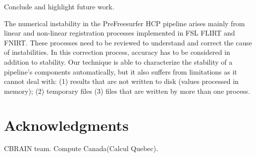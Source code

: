 \documentclass{article}
\begin{document}
Conclude and highlight future work.

The numerical instability in the PreFreesurfer HCP pipeline arises mainly from linear and non-linear registration processes 
implemented in FSL FLIRT and FNIRT. These processes need to be reviewed to understand and correct the cause of instabilities. 
In this correction process, accuracy has to be considered in addition to stability. Our technique is able to 
characterize the stability of a pipeline’s components automatically, but it also suffers from limitations as it cannot deal with: 
(1) results that are not written to disk (values processed in memory); (2) temporary files (3) files that are written by more than one process.


\section{Acknowledgments}

CBRAIN team. Compute Canada(Calcul Quebec).



\end{document}
